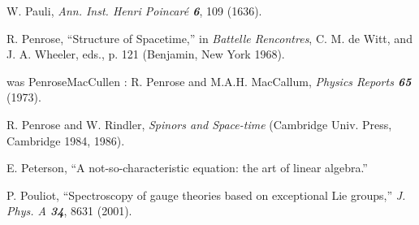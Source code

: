 

 W. Pauli,
    {\em Ann. Inst. Henri Poincar{\'e}  \bf 6}, 109 (1636).

 R. Penrose,
    ``Structure of Spacetime,''
     in {\em Battelle Rencontres},
     C. M. de Witt, and J. A. Wheeler, eds., p. 121
    (Benjamin, New York 1968).

%

was PenroseMacCullen :
 R. Penrose and M.A.H. MacCallum,
    {\em Physics Reports \bf 65} (1973).

 R. Penrose and W. Rindler,
    {\em Spinors and Space-time}
    (Cambridge Univ. Press, Cambridge 1984, 1986).


 E. Peterson,
        ``A not-so-characteristic equation: the art of linear algebra.''

P. Pouliot,
``Spectroscopy of gauge theories based on exceptional Lie groups,''
{\em J. Phys. A  \bf 34},  8631 (2001).


